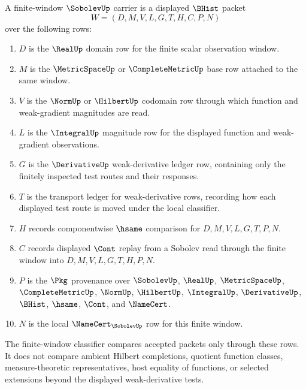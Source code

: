 \begin{definition}
\label{def:sobolev-finite-window-carrier}
A finite-window $\SobolevUp$ carrier is a displayed $\BHist$ packet
$$
W=(D,M,V,L,G,T,H,C,P,N)
$$
over the following rows:
\begin{enumerate}
\item $D$ is the $\RealUp$ domain row for the finite scalar observation window.
\item $M$ is the $\MetricSpaceUp$ or $\CompleteMetricUp$ base row attached to the same window.
\item $V$ is the $\NormUp$ or $\HilbertUp$ codomain row through which function and weak-gradient magnitudes are read.
\item $L$ is the $\IntegralUp$ magnitude row for the displayed function and weak-gradient observations.
\item $G$ is the $\DerivativeUp$ weak-derivative ledger row, containing only the finitely inspected test routes and their responses.
\item $T$ is the transport ledger for weak-derivative rows, recording how each displayed test route is moved under the local classifier.
\item $H$ records componentwise $\hsame$ comparison for $D,M,V,L,G,T,P,N$.
\item $C$ records displayed $\Cont$ replay from a Sobolev read through the finite window into $D,M,V,L,G,T,H,P,N$.
\item $P$ is the $\Pkg$ provenance over $\SobolevUp$, $\RealUp$, $\MetricSpaceUp$, $\CompleteMetricUp$, $\NormUp$, $\HilbertUp$, $\IntegralUp$, $\DerivativeUp$, $\BHist$, $\hsame$, $\Cont$, and $\NameCert$.
\item $N$ is the local $\NameCert_{\SobolevUp}$ row for this finite window.
\end{enumerate}
The finite-window classifier compares accepted packets only through these rows. It does not compare ambient Hilbert completions, quotient function classes, measure-theoretic representatives, host equality of functions, or selected extensions beyond the displayed weak-derivative tests.
\end{definition}

